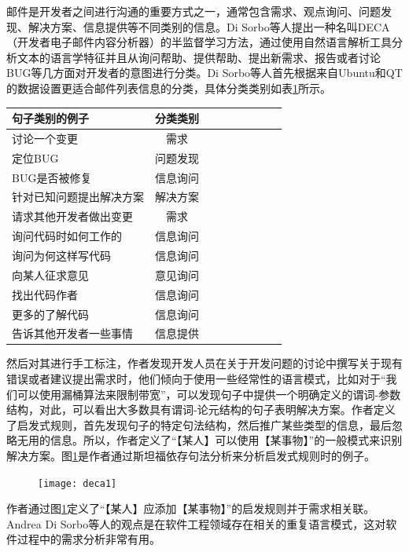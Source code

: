 邮件是开发者之间进行沟通的重要方式之一，通常包含需求、观点询问、问题发现、解决方案、信息提供等不同类别的信息。Di Sorbo等人\cite{Sorbo2016Development}提出一种名叫DECA（开发者电子邮件内容分析器）的半监督学习方法，通过使用自然语言解析工具分析文本的语言学特征并且从询问帮助、提供帮助、提出新需求、报告或者讨论BUG等几方面对开发者的意图进行分类。Di Sorbo等人首先根据来自Ubuntu和QT的数据设置更适合邮件列表信息的分类，具体分类类别如表\ref{tab:deca0}所示。
\begin{table}[htb]
    \label{tab:deca0}
    \centering
    \footnotesize%
    \setlength{\tabcolsep}{4pt}%
    \renewcommand{\arraystretch}{1.2}%
\begin{tabular}{lcccccccc}
\hline
句子类别的例子      & 分类类别 \\
\hline
讨论一个变更       & 需求 \\
定位BUG        & 问题发现 \\
BUG是否被修复     & 信息询问 \\
针对已知问题提出解决方案 & 解决方案 \\
请求其他开发者做出变更  & 需求 \\
询问代码时如何工作的   & 信息询问 \\
询问为何这样写代码    & 信息询问 \\
向某人征求意见      & 意见询问 \\
找出代码作者       & 信息询问 \\
更多的了解代码      & 信息询问 \\
告诉其他开发者一些事情  & 信息提供 \\
\hline
\end{tabular}
\end{table}
然后对其进行手工标注，作者发现开发人员在关于开发问题的讨论中撰写关于现有错误或者建议提出需求时，他们倾向于使用一些经常性的语言模式，比如对于“我们可以使用漏桶算法来限制带宽”，可以发现句子中提供一个明确定义的谓词-参数结构，对此，可以看出大多数具有谓词-论元结构的句子表明解决方案。作者定义了启发式规则，首先发现句子的特定句法结构，然后推广某些类型的信息，最后忽略无用的信息。所以，作者定义了“【某人】可以使用【某事物】”的一般模式来识别解决方案。图\ref{fig:deca1}是作者通过斯坦福依存句法分析来分析启发式规则时的例子。
\begin{figure}[htb]
    \centering
    \texttt{[image: deca1]}
    \label{fig:deca1}
\end{figure}
作者通过图\ref{fig:deca1}定义了“【某人】应添加【某事物】”的启发规则并于需求相关联。Andrea Di Sorbo等人的观点是在软件工程领域存在相关的重复语言模式，这对软件过程中的需求分析非常有用。

